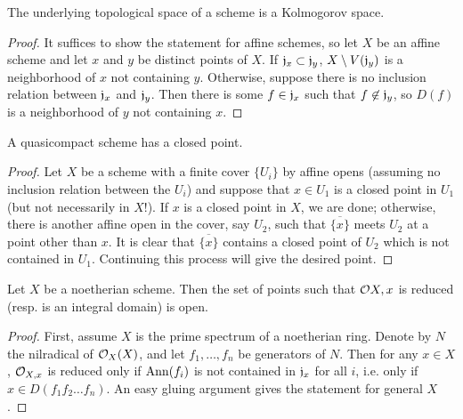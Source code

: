 \begin{exer}
	The underlying topological space of a scheme is a Kolmogorov space.
\end{exer}
\begin{proof}
	It suffices to show the statement for affine schemes, so let $X$ be an
	affine scheme and let $x$ and $y$ be distinct points of $X$. If
	$\mathfrak{j}_x \subset \mathfrak{j}_y$, $X \setminus V(\mathfrak{j}_y)$ is a neighborhood of
	$x$ not containing $y$. Otherwise, suppose there is no inclusion
	relation between $\mathfrak{j}_x$ and $\mathfrak{j}_y$. Then there is some $f
	\in \mathfrak{j}_x$ such that $f \not\in \mathfrak{j}_y$, so $D(f)$ is a neighborhood of
	$y$ not containing $x$.
\end{proof}

\begin{exer}
	A quasicompact scheme has a closed point.
\end{exer}
\begin{proof}
	Let $X$ be a scheme with a finite cover $\{U_i\}$ by affine opens
	(assuming no inclusion relation between the $U_i$) and suppose that
	$x \in U_1$ is a closed point in $U_1$ (but not necessarily in $X$!).
	If $x$ is a closed point in $X$, we are done; otherwise, there is
	another affine open in the cover, say $U_2$, such that
	$\overline{\{x\}}$ meets $U_2$ at a point other than $x$. It is clear
	that $\overline{\{x\}}$ contains a closed point of $U_2$ which is not
	contained in $U_1$. Continuing this process will give the desired point.
\end{proof}

\begin{exer}
	Let $X$ be a noetherian scheme. Then the set of points such that
	$\mathcal{O}{X,x}$ is reduced (resp. is an integral domain) is open.
\end{exer}
\begin{proof}
	First, assume $X$ is the prime spectrum of a noetherian ring. Denote by
	$N$ the nilradical of $\mathcal{O}_X(X)$, and let $f_1,\ldots,f_n$ be
	generators of $N$. Then for any $x \in X$, $\mathcal{O}_{X,x}$ is reduced only
	if $\operatorname{Ann}(f_i)$ is not contained in $\mathfrak{j}_x$ for all $i$, i.e. only if
	$x \in D(f_1f_2\ldots f_n)$. An easy gluing argument gives the statement
	for general $X$.
\end{proof}
